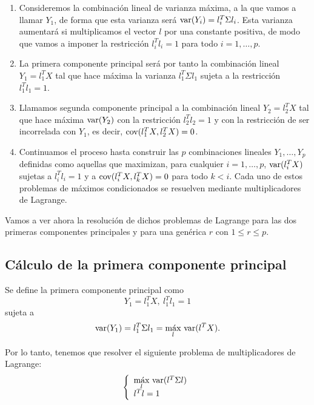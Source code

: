 \begin{enumerate}
\item Consideremos la combinación lineal de varianza máxima, a la que vamos a llamar $Y_1$, de forma que esta varianza será $\text{var}{(Y_i)}=l_i^T \Sigma l_i$. Esta varianza aumentará si multiplicamos el vector $l$ por una constante positiva, de modo que vamos a imponer la restricción $l_i^Tl_i = 1$ para todo $i=1, \dots, p$.
\item La primera componente principal será por tanto la combinación lineal $Y_1 = l_1^TX$ tal que hace máxima la varianza $l_1^T \Sigma l_1$ sujeta a la restricción $l_1^Tl_1 = 1$.
\item Llamamos segunda componente principal a la combinación lineal $Y_2 = l_2^TX$ tal que hace máxima $\text{var}{(Y_2)}$ con la restricción $l_2^Tl_2 = 1$ y con la restricción de ser incorrelada con $Y_1$, es decir, $\text{cov}{(l_1^TX, l_2^TX)} = 0$.
\item Continuamos el proceso hasta construir las $p$ combinaciones lineales $Y_1, \dots, Y_p$ definidas como aquellas que maximizan, para cualquier $i=1, \dots, p$, $\text{var}{(l_i^TX)}$ sujetas a $l_i^Tl_i = 1$ y a $\text{cov}{(l_i^TX, l_k^TX)} = 0$ para todo $k < i$. Cada uno de estos problemas de máximos condicionados se resuelven mediante multiplicadores de Lagrange.
\end{enumerate}

Vamos a ver ahora la resolución de dichos problemas de Lagrange para las dos primeras componentes principales y para una genérica $r$ con $ 1 \leq r \leq p$.

\subsection{Cálculo de la primera componente principal}

Se define la primera componente principal como 
\[	Y_1 = l_1^TX,\ l_1^Tl_1 = 1	\]
sujeta a 
\[	\text{var}{(Y_1)} = l_1^T\Sigma l_1 = \underset{l}{\text{máx}}\ \text{var}{(l^TX)}.	\]

Por lo tanto, tenemos que resolver el siguiente problema de multiplicadores de Lagrange:
\begin{equation*}
  \left\lbrace
  \begin{array}{l}
     \underset{l}{\text{máx}}\ \text{var}{(l^T\Sigma l)} \\
     l^Tl=1 \\
  \end{array}
  \right.
\end{equation*}

